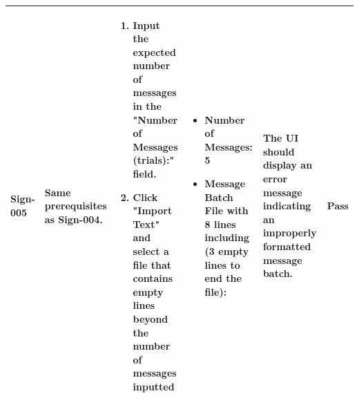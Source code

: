 \documentclass[]{final_report}
\theoremstyle{definition}
\begin{document}
\begin{longtable}{|l|p{2.5cm}|p{2.8cm}|p{3cm}|p{2cm}|p{1.5cm}|}
  Sign-005 & Same prerequisites as Sign-004. & 
  \begin{enumerate}
    \item Input the expected number of messages in the "Number of Messages (trials):" field.
    \item Click "Import Text" and select a file that contains empty lines beyond the number of messages inputted
  \end{enumerate} & 
  \begin{itemize}
    \item Number of Messages: 5
    \item Message Batch File with 8 lines including (3 empty lines to end the file): 
    
    
  \end{itemize}
  & The UI should display an error message indicating an improperly formatted message batch. & Pass} \\
  \hline


\end{longtable}
\end{document}
